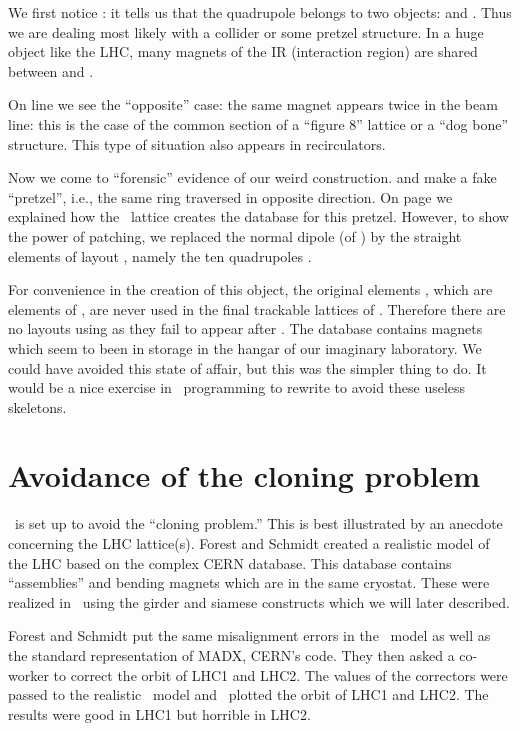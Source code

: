 We first notice : it tells us that the quadrupole  belongs to two objects:   and . Thus we are dealing most likely with a collider or some pretzel structure. In a huge object like the LHC, many magnets of the IR (interaction region) are shared between  and .

On line  we see the ``opposite'' case: the same magnet appears twice in the beam line: this is the case of the common section of a ``figure 8'' lattice or a ``dog bone'' structure. This type of situation also appears in recirculators. 

Now we come to ``forensic'' evidence of our weird construction.  and  make a fake ``pretzel'', i.e., the same ring traversed in opposite direction. On  page \pageref{lin:psr1.append.L2} we explained how  the \DNA\ lattice  creates the database for this pretzel. However, to show the power of patching, we replaced the normal dipole  (of ) by the straight elements of layout , namely the ten quadrupoles .

For convenience in the creation of this object, the original elements , which are elements of ,  are never used in the final trackable lattices of . Therefore there are no layouts using  as they fail to appear after .  The database  contains magnets which seem to been in storage in the hangar of our imaginary laboratory. We could have avoided this state of affair, but this was the simpler thing to do. It would be a nice exercise in \PTC\ programming to rewrite  to avoid these useless skeletons. 

\section{Avoidance of the cloning problem}
\label{sec:model.clone}


 \PTC\ is set up to avoid the ``cloning problem.'' This is best illustrated by an anecdote concerning the LHC lattice(s). Forest and Schmidt created a realistic model of the LHC based on the complex CERN database. This database contains ``assemblies'' and bending magnets which are in the same cryostat. These were realized in \PTC\ using the girder and siamese constructs which we will later described.

Forest and Schmidt put the same misalignment errors in the \PTC\ model as well as the standard representation of MADX, CERN's code. They then asked a co-worker to correct the orbit of LHC1 and LHC2. The values of the correctors were passed to the realistic \PTC\ model and \PTC\ plotted the orbit of LHC1 and LHC2.  The results were good in LHC1 but horrible in LHC2.


